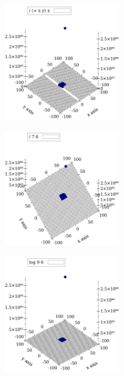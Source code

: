 \documentclass[10pt,a4paper]{article}
\begin{document}
\begin{center}
\includegraphics[width=5cm, height=5cm]{16}
\end{center}
\begin{center}
\includegraphics[width=5cm, height=5cm]{15}
\end{center}
\begin{center}
\includegraphics[width=5cm, height=5cm]{14}
\end{center}
\end{document}
